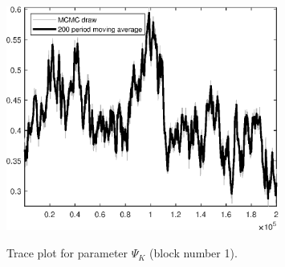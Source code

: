 \begin{figure}[H]
\centering
  \includegraphics[width=0.8\textwidth]{RBC_growth/graphs/TracePlot_Psi_K_blck_1}\\
    \caption{Trace plot for parameter ${\Psi_K}$ (block number 1).}
\end{figure}
